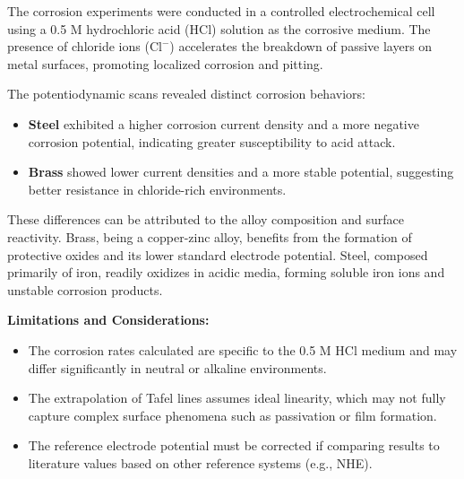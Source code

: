 The corrosion experiments were conducted in a controlled electrochemical cell using a 0.5 M hydrochloric acid (HCl) solution as the corrosive medium. The presence of chloride ions (\( \text{Cl}^- \)) accelerates the breakdown of passive layers on metal surfaces, promoting localized corrosion and pitting.

The potentiodynamic scans revealed distinct corrosion behaviors:
\begin{itemize}
    \item \textbf{Steel} exhibited a higher corrosion current density and a more negative corrosion potential, indicating greater susceptibility to acid attack.
    \item \textbf{Brass} showed lower current densities and a more stable potential, suggesting better resistance in chloride-rich environments.
\end{itemize}

These differences can be attributed to the alloy composition and surface reactivity. Brass, being a copper-zinc alloy, benefits from the formation of protective oxides and its lower standard electrode potential. Steel, composed primarily of iron, readily oxidizes in acidic media, forming soluble iron ions and unstable corrosion products.

\vspace{0.2cm}
\textbf{Limitations and Considerations:}
\begin{itemize}
    \item The corrosion rates calculated are specific to the 0.5 M HCl medium and may differ significantly in neutral or alkaline environments.
    \item The extrapolation of Tafel lines assumes ideal linearity, which may not fully capture complex surface phenomena such as passivation or film formation.
    \item The reference electrode potential must be corrected if comparing results to literature values based on other reference systems (e.g., NHE).
\end{itemize}

